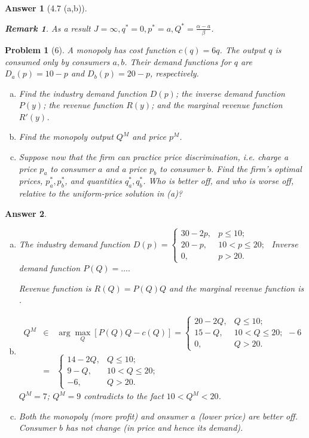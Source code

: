 \documentclass{article}
\newtheorem*{ans}{Answer}
\newtheorem*{prob}{{\bf Problem}}
\newtheorem{rem}{\bf Remark}
\newcommand{\1}{{\bf 1}}
\newcommand{\0}{{\mathbf{0}}}
\newcommand{\<}{\langle}
\renewcommand{\>}{\rangle}
\begin{document}
\begin{ans}[4.7 (a,b)]
\begin{enumerate}[(a)]
\begin{rem}
			As a result $J = \infty, q^*= 0, p^* = a, Q^* = \frac{\alpha -a }{\beta}$.
		\end{rem}
	\end{enumerate}
\end{ans}

\begin{prob}[6]
	A monopoly has cost function $c(q) = 6q$. The output $q$ is consumed only by consumers $a,b$. Their demand functions for $q$ are $D_a(p) = 10 - p$ and $D_b(p) = 20-p$, respectively.
	\begin{enumerate}[(a)]
		\item Find the industry demand function $D(p)$; the inverse demand function $P(y)$; the revenue function $R(y)$; and the marginal revenue function $R'(y)$.
		\item Find the monopoly output $Q^M$ and price $p^M$.
		\item Suppose now that the firm can practice price discrimination, i.e. charge a price $p_a$ to consumer $a$ and a price $p_b$ to consumer $b$. Find the firm's optimal prices, $p_a^*, p_b^*$, and quantities $q_a^*,q_b^*$. Who is better off, and who is worse off, relative to the uniform-price solution in (a)?
	\end{enumerate} 
\end{prob}
\begin{ans}
	\begin{enumerate}[(a)] 
		\item The industry demand function $D(p) = \left\{ \begin{array}{cc} 30 - 2p, & p \le 10; \\   20 - p, & 10 < p \le 20; \\0 ,  & p > 20.
		\end{array} \right.$
		Inverse demand function $P(Q) = \ldots.$
		
		Revenue function is $R(Q ) = P(Q)Q$ and the marginal revenue function is $ $.
		
		\item 
		\begin{eqnarray*} Q^M & \in &  \arg \max_Q \left[ P(Q)Q - c(Q)\right] =  \left\{ \begin{array}{cc} 20 - 2Q , & Q \le 10; \\   15 - Q , & 10 < Q \le 20; \\0 ,  & Q > 20.
		\end{array} \right. - 6  \\
	& = &  \left\{ \begin{array}{cc} 14 - 2Q , & Q \le 10; \\   9 - Q , & 10 < Q \le 20; \\  -6 ,  & Q > 20.
		\end{array} \right. 
	\end{eqnarray*}
$Q^M = 7$; $Q^M=9$ contradicts to the fact $10 < Q^M < 20$.
		\item Both the monopoly (more profit) and onsumer $a$ (lower price) are better off. Consumer $b$ has not change (in price and hence its demand).
	\end{enumerate}
\end{ans}
\end{document}
